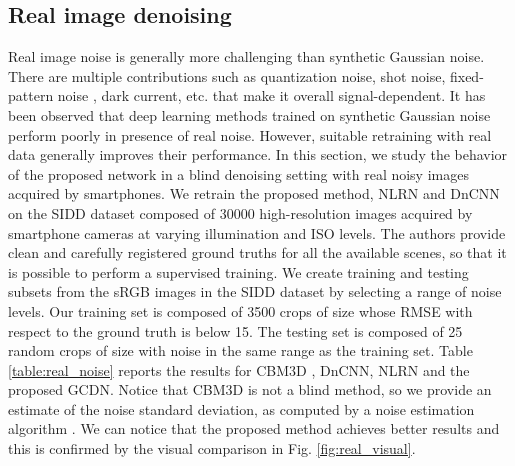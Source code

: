 \documentclass[journal]{IEEEtran}
\begin{document}
\subsection{Real image denoising}
Real image noise is generally more challenging than synthetic Gaussian noise. There are multiple contributions such as quantization noise, shot noise, fixed-pattern noise \cite{holst1998ccd,lukavs2006digital}, dark current, etc. that make it overall signal-dependent. It has been observed \cite{plotz2017benchmarking,SIDD_2018_CVPR} that deep learning methods trained on synthetic Gaussian noise perform poorly in presence of real noise. However, suitable retraining with real data generally improves their performance. In this section, we study the behavior of the proposed network in a blind denoising setting with real noisy images acquired by smartphones. We retrain the proposed method, NLRN and DnCNN on the SIDD dataset \cite{SIDD_2018_CVPR} composed of 30000 high-resolution images acquired by smartphone cameras at varying illumination and ISO levels. The authors provide clean and carefully registered ground truths for all the available scenes, so that it is possible to perform a supervised training. We create training and testing subsets from the sRGB images in the SIDD dataset by selecting a range of noise levels. Our training set is composed of 3500 crops of size  whose RMSE with respect to the ground truth is below 15. The testing set is composed of 25 random crops of size  with noise in the same range as the training set. Table \ref{table:real_noise} reports the results for CBM3D \cite{dabov2007color}, DnCNN, NLRN and the proposed GCDN. Notice that CBM3D is not a blind method, so we provide an estimate of the noise standard deviation, as computed by a noise estimation algorithm \cite{Chen2015Efficient}.
We can notice that the proposed method achieves better results and this is confirmed by the visual comparison in Fig. \ref{fig:real_visual}.
\end{document}
